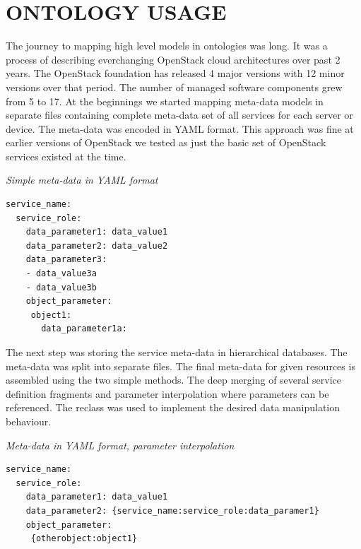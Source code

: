 
\section{ONTOLOGY USAGE}
\label{chap:usage}


The journey to mapping high level models in ontologies was long. It was a process of describing everchanging OpenStack cloud architectures over past 2 years. The OpenStack foundation has released 4 major versions with 12 minor versions over that period. The number of managed software components grew from 5 to 17. At the beginnings we started mapping meta-data models in separate files containing complete meta-data set of all services for each server or device. The meta-data was encoded in YAML format. This approach was fine at earlier versions of OpenStack we tested as just the basic set of OpenStack services existed at the time. 

\medskip

\noindent
{\it Simple meta-data in YAML format}
\begin{verbatim}
service_name:
  service_role:
    data_parameter1: data_value1
    data_parameter2: data_value2
    data_parameter3:
    - data_value3a
    - data_value3b    
    object_parameter:
     object1:
       data_parameter1a: 
\end{verbatim}
\noindent

The next step was storing the service meta-data in hierarchical databases. The meta-data was split into separate files. The final meta-data for given resources is assembled using the two simple methods. The deep merging of several service definition fragments and parameter interpolation where parameters can be referenced. The reclass \cite{Reclass} was used to implement the desired data manipulation behaviour.

\medskip

\noindent
{\it Meta-data in YAML format, parameter interpolation}
\begin{verbatim}
service_name:
  service_role:
    data_parameter1: data_value1
    data_parameter2: {service_name:service_role:data_paramer1}
    object_parameter:
     {otherobject:object1}
\end{verbatim}
\noindent

